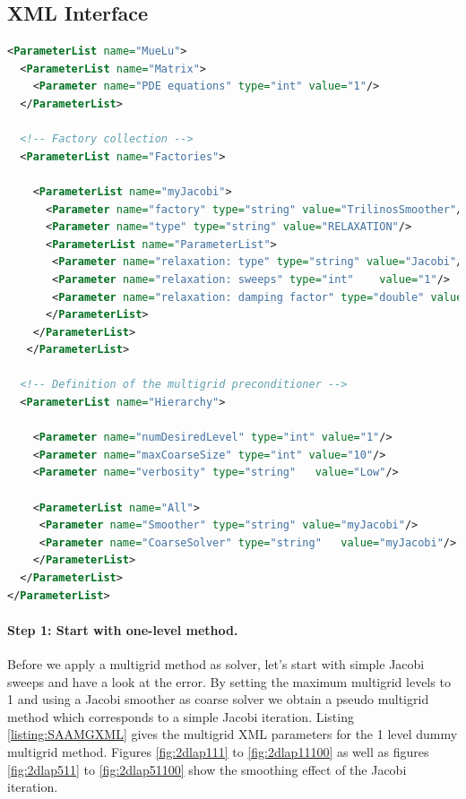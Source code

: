 \documentclass[12pt,a4paper]{article}
\newcommand{\MueLu}{MueLu}
\begin{document}

\subsection{XML Interface}

\begin{Listing} 
\begin{center} 
\begin{lstlisting}[language=XML,label=listing:SAAMGXML]
<ParameterList name="MueLu">
  <ParameterList name="Matrix">
    <Parameter name="PDE equations" type="int" value="1"/> 
  </ParameterList>

  <!-- Factory collection -->
  <ParameterList name="Factories">
     
    <ParameterList name="myJacobi">
      <Parameter name="factory" type="string" value="TrilinosSmoother"/>
      <Parameter name="type" type="string" value="RELAXATION"/>
      <ParameterList name="ParameterList">
       <Parameter name="relaxation: type" type="string" value="Jacobi"/>
       <Parameter name="relaxation: sweeps" type="int"    value="1"/>
       <Parameter name="relaxation: damping factor" type="double" value="0.9"/>
      </ParameterList>
    </ParameterList>
   </ParameterList>

  <!-- Definition of the multigrid preconditioner -->
  <ParameterList name="Hierarchy">

    <Parameter name="numDesiredLevel" type="int" value="1"/> 
    <Parameter name="maxCoarseSize" type="int" value="10"/>
    <Parameter name="verbosity" type="string"   value="Low"/>

    <ParameterList name="All">
     <Parameter name="Smoother" type="string" value="myJacobi"/>
     <Parameter name="CoarseSolver" type="string"   value="myJacobi"/>    
    </ParameterList>
  </ParameterList>
</ParameterList>
\end{lstlisting}
\caption{Structure of XML input file for \MueLu~ with smoothed aggregation transfer operators and Jacobi level smoothers.} 
\label{listing:SAAMGXML}
\end{center}
\end{Listing}

\paragraph{Step 1: Start with one-level method.}
Before we apply a multigrid method as solver, let's start with simple Jacobi sweeps and have a look at the error.
By setting the maximum multigrid levels to 1 and using a Jacobi smoother as coarse solver we obtain a pseudo multigrid method which corresponds to a simple Jacobi iteration. Listing \ref{listing:SAAMGXML} gives the multigrid XML parameters for the 1 level dummy multigrid method. Figures \ref{fig:2dlap111} to \ref{fig:2dlap11100} as well as figures \ref{fig:2dlap511} to \ref{fig:2dlap51100} show the smoothing effect of the Jacobi iteration.
\end{document}
